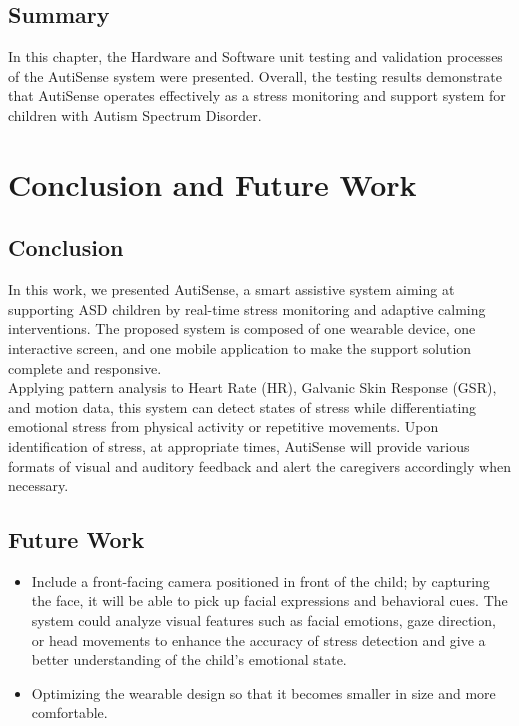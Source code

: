 \documentclass[a4paper,12pt]{report}
\begin{document}
\section{Summary}
In this chapter, the Hardware and Software unit testing and validation processes of the AutiSense system were presented. Overall, the testing results demonstrate that AutiSense operates effectively as a stress monitoring and support system for children with Autism Spectrum Disorder.



\chapter{Conclusion and Future Work}
\section{Conclusion}
In this work, we presented AutiSense, a smart assistive system aiming at supporting ASD children by real-time stress monitoring and adaptive calming interventions. The proposed system is composed of one wearable device, one interactive screen, and one mobile application to make the support solution complete and responsive.\\[0.1cm]

Applying pattern analysis to Heart Rate (HR), Galvanic Skin Response (GSR), and motion data, this system can detect states of stress while differentiating emotional stress from physical activity or repetitive movements. Upon identification of stress, at appropriate times, AutiSense will provide various formats of visual and auditory feedback and alert the caregivers accordingly when necessary.

\section{Future Work}
\begin{itemize}
    \item  
    Include a front-facing camera positioned in front of the child; by capturing the face, it will be able to pick up facial expressions and behavioral cues. The system could analyze visual features such as facial emotions, gaze direction, or head movements to enhance the accuracy of stress detection and give a better understanding of the child's emotional state.
    
    \item 
    Optimizing the wearable design so that it becomes smaller in size and more comfortable.
\end{itemize}
\end{document}
